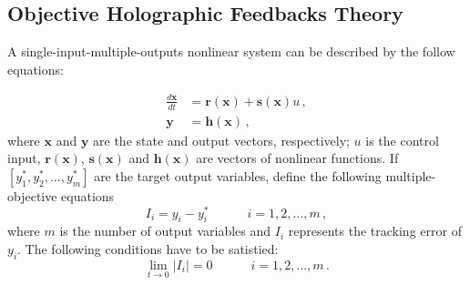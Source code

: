 \documentclass[journal]{IEEEtran}
\begin{document}
\subsection{Objective Holographic Feedbacks Theory}
A single-input-multiple-outputs nonlinear system can be described by the follow equations:

\begin{equation}
  \label{Eq.1}
  \begin{aligned}
     \frac{d \bm{x}}{dt} &= \bm{r}(\bm{x})+\bm{s}(\bm{x})u \, , \\
     \bm{y} &= \bm{h}(\bm{x})  \, , 
   \end{aligned}
\end{equation}
where $\bm{x}$ and $\bm{y}$ are the state
and output vectors, respectively; $u$ is the control input, $\bm{r}(\bm{x})$, $\bm{s}(\bm{x})$ and $\bm{h}(\bm{x})$ are vectors of nonlinear functions. If $[y^{*}_{1},y^{*}_{2},...,y^{*}_{m}]$ are the target output variables, define the following multiple-objective equations
%
\begin{equation}
\label{Eq.2}
  I_i=y_i-y^{*}_{i} \qquad \quad i=1,2,\dots,m \, ,
\end{equation}
where $m$ is the number of output variables and $I_i$ represents
the tracking error of $y_i$. The following conditions have to be satistied:
\begin{equation}
  \lim_{t\rightarrow 0}
  \left|I_i \right|=0   \qquad \quad i=1, 2, \dots, m \, .
  \label{Eq.3}
\end{equation}
\end{document}
